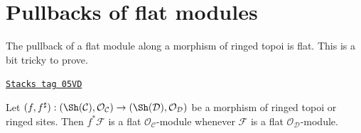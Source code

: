 \section{Pullbacks of flat modules}
\label{sites-modules-section-pullback-flat}
The pullback of a flat module along a morphism of ringed topoi is flat.
This is a bit tricky to prove.

\begin{lemma}
\label{sites-modules-lemma-pullback-flat}
\href{https://stacks.math.columbia.edu/tag/05VD}{\texttt{Stacks tag 05VD}}

\begin{reference}
\cite[Expos\'e V, Corollary 1.7.1]{SGA4}
\end{reference}
Let
$(f, f^\sharp) :
(\Sh(\mathcal{C}), \mathcal{O}_\mathcal{C})
\to
(\Sh(\mathcal{D}), \mathcal{O}_\mathcal{D})$
be a morphism of ringed topoi or ringed sites.
Then $f^*\mathcal{F}$ is a flat $\mathcal{O}_\mathcal{C}$-module
whenever $\mathcal{F}$ is a flat $\mathcal{O}_\mathcal{D}$-module.
\end{lemma}

